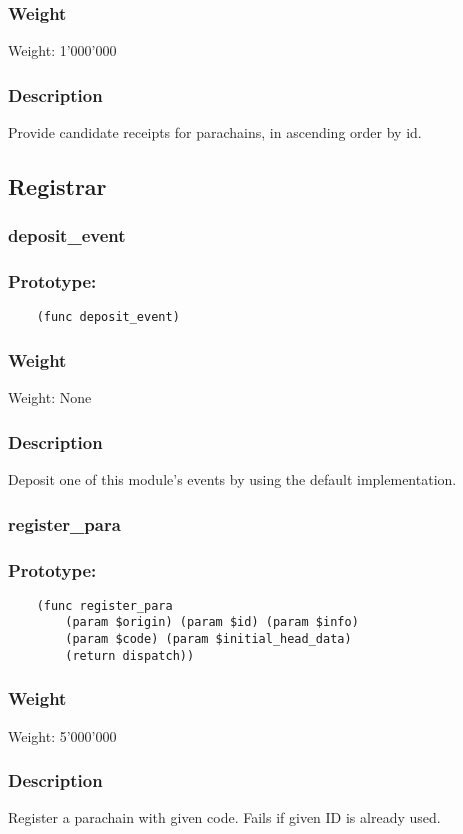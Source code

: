 \documentclass[11pt,a4paper]{article}
\begin{document}
\subsubsection*{Weight}
Weight: 1'000'000
\subsubsection*{Description}
Provide candidate receipts for parachains, in ascending order by id.

\subsection{Registrar}
\subsubsection{deposit\_event}
\subsubsection*{Prototype:}
\begin{verbatim}
    (func deposit_event)
\end{verbatim}
\subsubsection*{Weight}
Weight: None 
\subsubsection*{Description}
Deposit one of this module's events by using the default implementation.

\subsubsection{register\_para}
\subsubsection*{Prototype:}
\begin{verbatim}
    (func register_para
        (param $origin) (param $id) (param $info)
        (param $code) (param $initial_head_data)
        (return dispatch))
\end{verbatim}
\subsubsection*{Weight}
Weight: 5'000'000 
\subsubsection*{Description}
Register a parachain with given code. Fails if given ID is already used.
\end{document}
